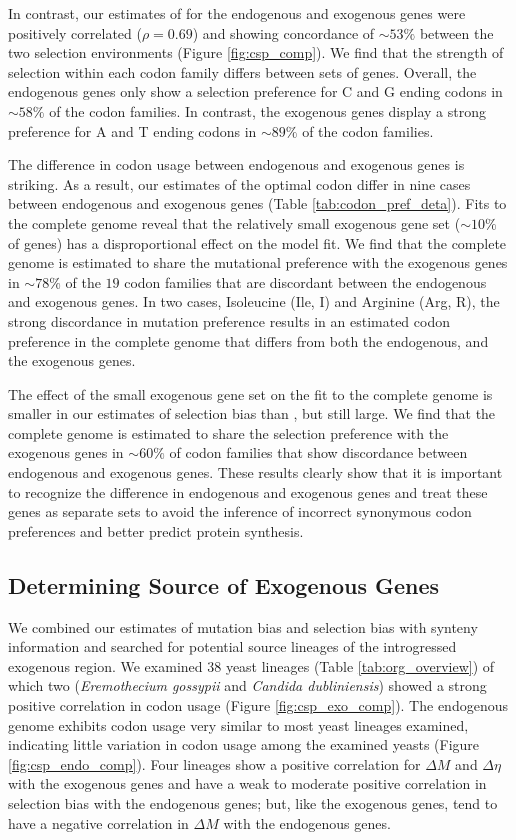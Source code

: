 In contrast, our estimates of \DE for the endogenous and exogenous genes were positively correlated ($\rho = 0.69$) and showing concordance of $\sim53\%$ between the two selection environments (Figure \ref{fig:csp_comp}).
We find that the strength of selection within each codon family differs between sets of genes.
Overall, the endogenous genes only show a selection preference for C and G ending codons in $\sim58\%$ of the codon families.
In contrast, the exogenous genes display a strong preference for A and T ending codons in $\sim89\%$ of the codon families.

The difference in codon usage between endogenous and exogenous genes is striking.
As a result, our estimates of the optimal codon differ in nine cases between endogenous and exogenous genes (Table \ref{tab:codon_pref_deta}).
Fits to the complete \kluyveri genome reveal that the relatively small exogenous gene set ($\sim 10\%$ of genes) has a disproportional effect on the model fit.
We find that the complete \kluyveri genome is estimated to share the mutational preference with the exogenous genes in $\sim78\%$ of the $19$ codon families that are discordant between the endogenous and exogenous genes.
In two cases, Isoleucine (Ile, I) and Arginine (Arg, R), the strong discordance in mutation preference results in an estimated codon preference in the complete \kluyveri genome that differs from both the endogenous, and the exogenous genes.

The effect of the small exogenous gene set on the fit to the complete \kluyveri genome is smaller in our estimates of selection bias \DE than \DM, but still large.
We find that the complete \kluyveri genome is estimated to share the selection preference with the exogenous genes in $\sim60\%$ of codon families that show discordance between endogenous and exogenous genes.
These results clearly show that it is important to recognize the difference in endogenous and exogenous genes and treat these genes as separate sets to avoid the inference of incorrect synonymous codon preferences and better predict protein synthesis.

\subsection{Determining Source of Exogenous Genes}

We combined our estimates of mutation bias \DM and selection bias \DE with synteny information and searched for potential source lineages of the introgressed exogenous region.
We examined 38 yeast lineages (Table \ref{tab:org_overview}) of which two (\emph{Eremothecium gossypii} and \emph{Candida dubliniensis}) showed a strong positive correlation in codon usage (Figure \ref{fig:csp_exo_comp}).
The endogenous \kluyveri genome exhibits codon usage very similar to most yeast lineages examined, indicating little variation in codon usage among the examined yeasts (Figure \ref{fig:csp_endo_comp}).
Four lineages show a positive correlation for $\Delta M$ and $\Delta \eta$ with the exogenous genes and have a weak to moderate positive correlation in selection bias with the endogenous genes; but, like the exogenous genes, tend to have a negative correlation in $\Delta M$ with the endogenous genes.

